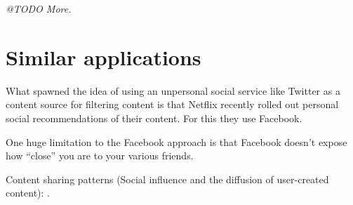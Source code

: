 
\emph{@TODO More.}


\section{Similar applications} %
\label{sec:similar_applications}

What spawned the idea of using an unpersonal social service like Twitter as a content source for filtering content is that Netflix recently rolled out personal social recommendations of their content.
For this they use Facebook.

One huge limitation to the Facebook approach is that Facebook doesn't expose how ``close'' you are to your various friends.

Content sharing patterns (Social influence and the diffusion of user-created content): \cite{Bakshy2009}.


